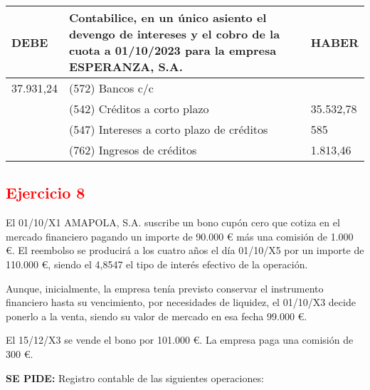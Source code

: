 \begin{enumerate}[label=\textbf{\alph*})]
        \begin{table}[H]
            \centering
            \begin{tabular}{|p{3cm}|p{6cm}|p{3cm}|}
            \hline
            \rowcolor{blue!30}
            \textbf{DEBE} & \textbf{Contabilice, en un único asiento el devengo de intereses y el cobro de la cuota a 01/10/2023 para la empresa ESPERANZA, S.A.} & \textbf{HABER} \\
            \hline
            37.931,24 & (572) Bancos c/c & \\
            \hline
            & (542) Créditos a corto plazo & 35.532,78 \\
            \hline
            & (547) Intereses a corto plazo de créditos & 585 \\
            \hline
            & (762) Ingresos de créditos & 1.813,46 \\
            \hline
            \end{tabular}
        \end{table}


    \end{enumerate}

    \newpage
    \subsection*{\textcolor{red}{\textbf{Ejercicio 8}}}

    El 01/10/X1 AMAPOLA, S.A. suscribe un bono cupón cero que cotiza en el mercado financiero pagando un importe de 90.000 € más una comisión de 1.000 €. El reembolso se producirá a los cuatro años el día 01/10/X5 por un importe de 110.000 €, siendo el 4,8547 el tipo de interés efectivo de la operación.

    Aunque, inicialmente, la empresa tenía previsto conservar el instrumento financiero hasta su vencimiento, por necesidades de liquidez, el 01/10/X3 decide ponerlo a la venta, siendo su valor de mercado en esa fecha 99.000 €.

    El 15/12/X3 se vende el bono por 101.000 €. La empresa paga una comisión de 300 €.

    \textbf{SE PIDE:} Registro contable de las siguientes operaciones:

